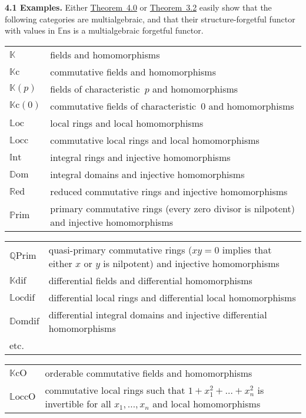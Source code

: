 \documentclass{article}
\newenvironment{rmenv}[1]
  {\phantomsection\par\medskip\noindent\textbf{#1.}\rmfamily}
  {\medskip}
\newcommand{\bb}[1]{{\mathbb{#1}}}
\newcommand{\Set}{\mathbb{E}\mathrm{ns}}
\newcommand{\oldpage}[1]{\marginpar{\footnotesize$\Big\vert$ \textit{p.~#1}}}
\begin{document}
\begin{rmenv}{4.1 Examples}
\label{4.1}
  Either \hyperref[4.0]{Theorem~4.0} or \hyperref[3.2]{Theorem~3.2} easily show that the following categories are multialgebraic, and that their structure-forgetful functor with values in $\Set$ is a multialgebraic forgetful functor.
  \begin{longtable}{p{0.5in}p{4.4in}}
    $\bb{K}$ & fields and homomorphisms
  \\$\bb{K}\mathrm{c}$ & commutative fields and homomorphisms
  \\$\bb{K}(p)$ & fields of characteristic~$p$ and homomorphisms
  \\$\bb{K}\mathrm{c}(0)$ & commutative fields of characteristic~$0$ and homomorphisms
  \\$\bb{L}\mathrm{oc}$ & local rings and local homomorphisms
  \\$\bb{L}\mathrm{occ}$ & commutative local rings and local homomorphisms
  \\$\bb{I}\mathrm{nt}$ & integral rings and injective homomorphisms
  \\$\bb{D}\mathrm{om}$ & integral domains and injective homomorphisms
  \\$\bb{R}\mathrm{ed}$ & reduced commutative rings and injective homomorphisms
  \\$\bb{P}\mathrm{rim}$ & primary commutative rings (every zero divisor is nilpotent) and injective homomorphisms
  \end{longtable}
\oldpage{205}
  \begin{longtable}{p{0.5in}p{4.4in}}
    $\bb{Q}\mathrm{Prim}$ & quasi-primary commutative rings ($xy=0$ implies that either $x$ or $y$ is nilpotent) and injective homomorphisms
  \\$\bb{K}\mathrm{dif}$ & differential fields and differential homomorphisms
  \\$\bb{L}\mathrm{ocdif}$ & differential local rings and differential local homomorphisms
  \\$\bb{D}\mathrm{omdif}$ & differential integral domains and injective differential homomorphisms
  \\etc.
  \end{longtable}
  \begin{longtable}{p{0.5in}p{4.4in}}
    $\bb{K}\mathrm{cO}$ & orderable commutative fields and homomorphisms
  \\$\bb{L}\mathrm{occO}$ & commutative local rings such that $1+x_1^2+\ldots+x_n^2$ is invertible for all $x_1,\ldots,x_n$ and local homomorphisms

\end{longtable}
\end{rmenv}
\end{document}

